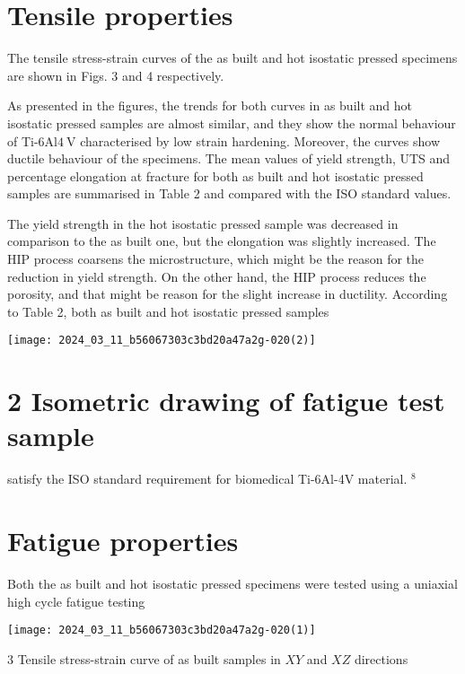 \documentclass[10pt]{article}
\begin{document}
\section*{Tensile properties}
The tensile stress-strain curves of the as built and hot isostatic pressed specimens are shown in Figs. 3 and 4 respectively.

As presented in the figures, the trends for both curves in as built and hot isostatic pressed samples are almost similar, and they show the normal behaviour of Ti-6Al$4 \mathrm{~V}$ characterised by low strain hardening. Moreover, the curves show ductile behaviour of the specimens. The mean values of yield strength, UTS and percentage elongation at fracture for both as built and hot isostatic pressed samples are summarised in Table 2 and compared with the ISO standard values.

The yield strength in the hot isostatic pressed sample was decreased in comparison to the as built one, but the elongation was slightly increased. The HIP process coarsens the microstructure, which might be the reason for the reduction in yield strength. On the other hand, the HIP process reduces the porosity, and that might be reason for the slight increase in ductility. According to Table 2, both as built and hot isostatic pressed samples

\begin{center}
\texttt{[image: 2024\_03\_11\_b56067303c3bd20a47a2g-020(2)]}
\end{center}

\section*{2 Isometric drawing of fatigue test sample}
satisfy the ISO standard requirement for biomedical Ti-6Al-4V material. ${ }^{8}$

\section*{Fatigue properties}
Both the as built and hot isostatic pressed specimens were tested using a uniaxial high cycle fatigue testing

\begin{center}
\texttt{[image: 2024\_03\_11\_b56067303c3bd20a47a2g-020(1)]}
\end{center}

3 Tensile stress-strain curve of as built samples in $X Y$ and $X Z$ directions
\end{document}
